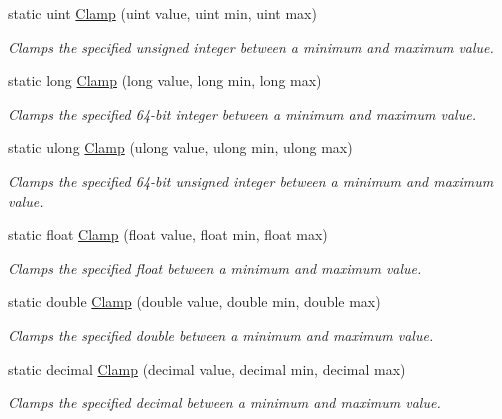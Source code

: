 \begin{DoxyCompactItemize}
static uint \hyperlink{class_tri_devs_1_1_tri_engine2_d_1_1_helpers_1_1_math_ac47eb16092e993da716e3187e94e70fe}{Clamp} (uint value, uint min, uint max)
\begin{DoxyCompactList}\small\item\em Clamps the specified unsigned integer between a minimum and maximum value. \end{DoxyCompactList}\item 
static long \hyperlink{class_tri_devs_1_1_tri_engine2_d_1_1_helpers_1_1_math_a8bf4a27be5be0d5019f4c4c4630dea12}{Clamp} (long value, long min, long max)
\begin{DoxyCompactList}\small\item\em Clamps the specified 64-\/bit integer between a minimum and maximum value. \end{DoxyCompactList}\item 
static ulong \hyperlink{class_tri_devs_1_1_tri_engine2_d_1_1_helpers_1_1_math_a36137a079842e61c479e49912dd7c825}{Clamp} (ulong value, ulong min, ulong max)
\begin{DoxyCompactList}\small\item\em Clamps the specified 64-\/bit unsigned integer between a minimum and maximum value. \end{DoxyCompactList}\item 
static float \hyperlink{class_tri_devs_1_1_tri_engine2_d_1_1_helpers_1_1_math_ab7bef68051503cf981d8d40a42995bd7}{Clamp} (float value, float min, float max)
\begin{DoxyCompactList}\small\item\em Clamps the specified float between a minimum and maximum value. \end{DoxyCompactList}\item 
static double \hyperlink{class_tri_devs_1_1_tri_engine2_d_1_1_helpers_1_1_math_a1ca86361f1c492c65f901a98b86fd710}{Clamp} (double value, double min, double max)
\begin{DoxyCompactList}\small\item\em Clamps the specified double between a minimum and maximum value. \end{DoxyCompactList}\item 
static decimal \hyperlink{class_tri_devs_1_1_tri_engine2_d_1_1_helpers_1_1_math_ae1f14f9e4637d28e90c75c8660332b24}{Clamp} (decimal value, decimal min, decimal max)
\begin{DoxyCompactList}\small\item\em Clamps the specified decimal between a minimum and maximum value. \end{DoxyCompactList}\end{DoxyCompactItemize}


